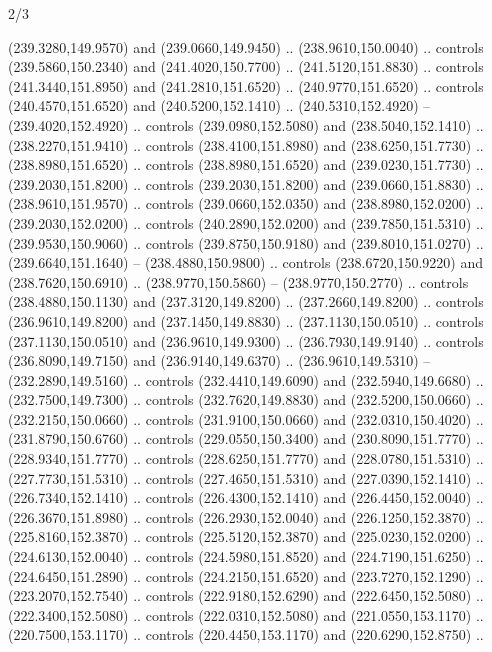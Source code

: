 \begin{flagdescription}{2/3}
\begin{scope}[xshift=0.5\flaglength,yshift=0.5\flagwidth,scale=\flagwidth/259.2]
\begin{scope}[y=0.8pt, x=0.8pt, yscale=-1,shift={(-243,-162)}]
      (239.3280,149.9570) and (239.0660,149.9450) .. (238.9610,150.0040) .. controls
      (239.5860,150.2340) and (241.4020,150.7700) .. (241.5120,151.8830) .. controls
      (241.3440,151.8950) and (241.2810,151.6520) .. (240.9770,151.6520) .. controls
      (240.4570,151.6520) and (240.5200,152.1410) .. (240.5310,152.4920) --
      (239.4020,152.4920) .. controls (239.0980,152.5080) and (238.5040,152.1410) ..
      (238.2270,151.9410) .. controls (238.4100,151.8980) and (238.6250,151.7730) ..
      (238.8980,151.6520) .. controls (238.8980,151.6520) and (239.0230,151.7730) ..
      (239.2030,151.8200) .. controls (239.2030,151.8200) and (239.0660,151.8830) ..
      (238.9610,151.9570) .. controls (239.0660,152.0350) and (238.8980,152.0200) ..
      (239.2030,152.0200) .. controls (240.2890,152.0200) and (239.7850,151.5310) ..
      (239.9530,150.9060) .. controls (239.8750,150.9180) and (239.8010,151.0270) ..
      (239.6640,151.1640) -- (238.4880,150.9800) .. controls (238.6720,150.9220) and
      (238.7620,150.6910) .. (238.9770,150.5860) -- (238.9770,150.2770) .. controls
      (238.4880,150.1130) and (237.3120,149.8200) .. (237.2660,149.8200) .. controls
      (236.9610,149.8200) and (237.1450,149.8830) .. (237.1130,150.0510) .. controls
      (237.1130,150.0510) and (236.9610,149.9300) .. (236.7930,149.9140) .. controls
      (236.8090,149.7150) and (236.9140,149.6370) .. (236.9610,149.5310) --
      (232.2890,149.5160) .. controls (232.4410,149.6090) and (232.5940,149.6680) ..
      (232.7500,149.7300) .. controls (232.7620,149.8830) and (232.5200,150.0660) ..
      (232.2150,150.0660) .. controls (231.9100,150.0660) and (232.0310,150.4020) ..
      (231.8790,150.6760) .. controls (229.0550,150.3400) and (230.8090,151.7770) ..
      (228.9340,151.7770) .. controls (228.6250,151.7770) and (228.0780,151.5310) ..
      (227.7730,151.5310) .. controls (227.4650,151.5310) and (227.0390,152.1410) ..
      (226.7340,152.1410) .. controls (226.4300,152.1410) and (226.4450,152.0040) ..
      (226.3670,151.8980) .. controls (226.2930,152.0040) and (226.1250,152.3870) ..
      (225.8160,152.3870) .. controls (225.5120,152.3870) and (225.0230,152.0200) ..
      (224.6130,152.0040) .. controls (224.5980,151.8520) and (224.7190,151.6250) ..
      (224.6450,151.2890) .. controls (224.2150,151.6520) and (223.7270,152.1290) ..
      (223.2070,152.7540) .. controls (222.9180,152.6290) and (222.6450,152.5080) ..
      (222.3400,152.5080) .. controls (222.0310,152.5080) and (221.0550,153.1170) ..
      (220.7500,153.1170) .. controls (220.4450,153.1170) and (220.6290,152.8750) ..

\end{scope}
\end{scope}
\end{flagdescription}
